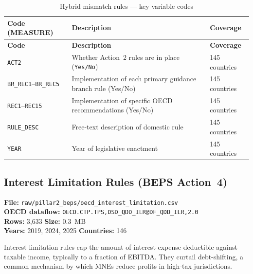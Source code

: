 \documentclass[11pt,a4paper]{article}
\begin{document}
\begin{longtable}{L{2.8cm} L{6.5cm} C{2.5cm}}
    \caption{Hybrid mismatch rules --- key variable codes}
    \label{tab:hybrid}\\
    \toprule
    \textbf{Code (MEASURE)} & \textbf{Description} & \textbf{Coverage} \\
    \midrule
    \endfirsthead
    \toprule
    \textbf{Code} & \textbf{Description} & \textbf{Coverage} \\
    \midrule
    \endhead
    \bottomrule
    \endlastfoot
    \texttt{ACT2}     & Whether Action~2 rules are in place (\texttt{Yes/No}) & 145 countries \\
    \texttt{BR\_REC1}--\texttt{BR\_REC5} & Implementation of each primary guidance branch rule (Yes/No) & 145 countries \\
    \texttt{REC1}--\texttt{REC15}  & Implementation of specific OECD recommendations (Yes/No) & 145 countries \\
    \texttt{RULE\_DESC} & Free-text description of domestic rule & 145 countries \\
    \texttt{YEAR}       & Year of legislative enactment & 145 countries \\
\end{longtable}

\subsection{Interest Limitation Rules (BEPS Action~4)}
\label{subsec:beps_interest}

\textbf{File:} \texttt{raw/pillar2\_beps/oecd\_interest\_limitation.csv}\\
\textbf{OECD dataflow:} \texttt{OECD.CTP.TPS,DSD\_QDD\_ILR@DF\_QDD\_ILR,2.0}\\
\textbf{Rows:} 3{,}633 \quad \textbf{Size:} 0.3~MB\\
\textbf{Years:} 2019, 2024, 2025 \quad \textbf{Countries:} 146

Interest limitation rules cap the amount of interest expense deductible against
taxable income, typically to a fraction of EBITDA.  They curtail debt-shifting,
a common mechanism by which MNEs reduce profits in high-tax jurisdictions.
\end{document}
